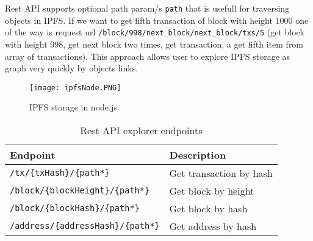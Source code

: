Rest API supports optional path param/s \texttt{path} that is usefull for traversing objects in IPFS. If we want to get fifth transaction of block with height 1000 one of the way is request url \texttt{/block/998/next\_block/next\_block/txs/5} (get block with height 998, get next block two times, get transaction, a get fifth item from array of transactions). This approach allows user to explore IPFS storage as graph very quickly by objects links.

\begin{figure}[h]
    \centering
    \texttt{[image: ipfsNode.PNG]}
    \caption{IPFS storage in node.js}
    \label{nodeIPFS}
\end{figure}


\begin{table}[h]
    \centering
    \begin{tabular}{|l|l|}
    \hline
    Endpoint                           & Description                       \\ \hline
    \texttt{/tx/\{txHash\}/\{path*\}}           & Get transaction by hash  \\ \hline
    \texttt{/block/\{blockHeight\}/\{path*\}}   & Get block by height      \\ \hline
    \texttt{/block/\{blockHash\}/\{path*\}}     & Get block by hash        \\ \hline
    \texttt{/address/\{addressHash\}/\{path*\}} & Get address by hash      \\ \hline
    \end{tabular}
    \caption{Rest API explorer endpoints}
    \label{tab:explorerApiEndpoints}
\end{table}